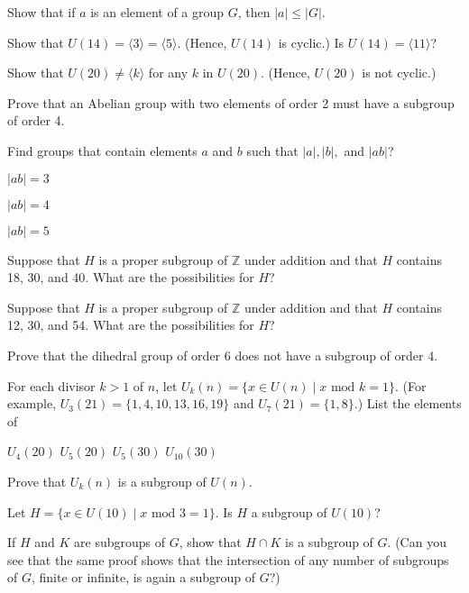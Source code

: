 \documentclass[11pt,largemargins]{homework}
\begin{document}
\question
Show that if $a$ is an element of a group $G$, then $|a|\leq |G|$.

\question
Show that $U(14)=\langle 3 \rangle = \langle 5 \rangle$. (Hence, $U(14)$ is cyclic.) Is $U(14)=\langle 11 \rangle$?

\question
Show that $U(20)\neq \langle k \rangle$ for any $k$ in $U(20)$. (Hence, $U(20)$ is not cyclic.)

\question
Prove that an Abelian group with two elements of order 2 must have a subgroup of order 4.

\question
Find groups that contain elements $a$ and $b$ such that $|a|, |b|,$ and $|ab|$?
\begin{alphaparts}
    \questionpart
    $|ab|=3$

    \questionpart
    $|ab|=4$

    \questionpart
    $|ab|=5$

\end{alphaparts}

\question
Suppose that $H$ is a proper subgroup of $\mathbb{Z}$ under addition and that $H$ contains 18, 30, and 40. 
What are the possibilities for $H$?

\question
Suppose that $H$ is a proper subgroup of $\mathbb{Z}$ under addition and that $H$ contains 12, 30, and 54. 
What are the possibilities for $H$?

\question
Prove that the dihedral group of order 6 does not have a subgroup of order 4.

\question
For each divisor $k>1$ of $n$, let $U_k(n)=\{x\in U(n) \;|\; x \text{ mod } k = 1\}$. 
(For example, $U_3(21)=\{1,4,10,13,16,19\}$ and $U_7(21)=\{1,8\}$.)
List the elements of 
\begin{alphaparts}
    \questionpart
    $U_4(20)$
    \questionpart
    $U_5(20)$
    \questionpart
    $U_5(30)$
    \questionpart
    $U_{10}(30)$

\end{alphaparts}

Prove that $U_k(n)$ is a subgroup of $U(n)$. 

Let $H=\{x\in U(10)\;|\; x\text{ mod }3=1\}$. Is $H$ a subgroup of $U(10)$? 

\question
If $H$ and $K$ are subgroups of $G$, show that $H\cap K$ is a subgroup of $G$. (Can you see that the same proof shows that the 
intersection of any number of subgroups of $G$, finite or infinite, is again a subgroup of $G$?)
\end{document}
